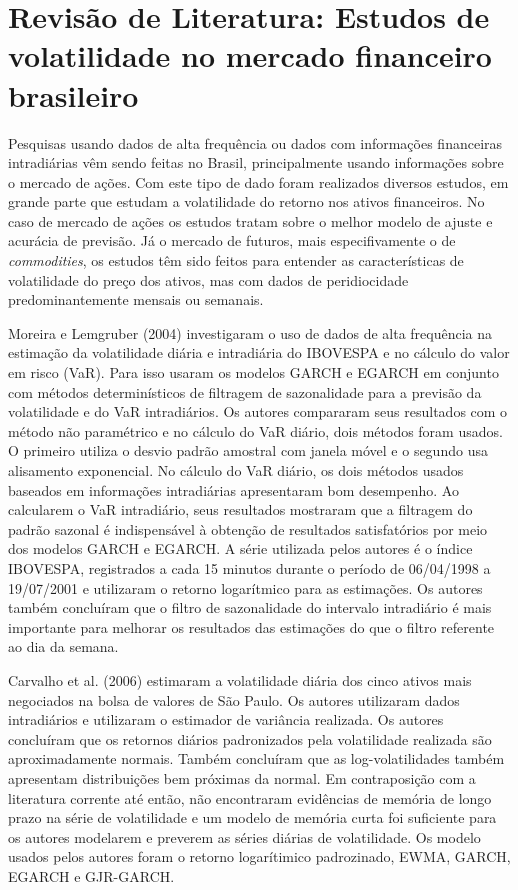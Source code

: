 \documentclass[]{article}
\title{}
\author{}
\date{}
\begin{document}
\section{Revisão de Literatura: Estudos de volatilidade no mercado
financeiro
brasileiro}\label{revisao-de-literatura-estudos-de-volatilidade-no-mercado-financeiro-brasileiro}

Pesquisas usando dados de alta frequência ou dados com informações
financeiras intradiárias vêm sendo feitas no Brasil, principalmente
usando informações sobre o mercado de ações. Com este tipo de dado foram
realizados diversos estudos, em grande parte que estudam a volatilidade
do retorno nos ativos financeiros. No caso de mercado de ações os
estudos tratam sobre o melhor modelo de ajuste e acurácia de previsão.
Já o mercado de futuros, mais especifivamente o de \emph{commodities},
os estudos têm sido feitos para entender as características de
volatilidade do preço dos ativos, mas com dados de peridiocidade
predominantemente mensais ou semanais.

Moreira e Lemgruber (2004) investigaram o uso de dados de alta
frequência na estimação da volatilidade diária e intradiária do IBOVESPA
e no cálculo do valor em risco (VaR). Para isso usaram os modelos GARCH
e EGARCH em conjunto com métodos determinísticos de filtragem de
sazonalidade para a previsão da volatilidade e do VaR intradiários. Os
autores compararam seus resultados com o método não paramétrico e no
cálculo do VaR diário, dois métodos foram usados. O primeiro utiliza o
desvio padrão amostral com janela móvel e o segundo usa alisamento
exponencial. No cálculo do VaR diário, os dois métodos usados baseados
em informações intradiárias apresentaram bom desempenho. Ao calcularem o
VaR intradiário, seus resultados mostraram que a filtragem do padrão
sazonal é indispensável à obtenção de resultados satisfatórios por meio
dos modelos GARCH e EGARCH. A série utilizada pelos autores é o índice
IBOVESPA, registrados a cada 15 minutos durante o período de 06/04/1998
a 19/07/2001 e utilizaram o retorno logarítmico para as estimações. Os
autores também concluíram que o filtro de sazonalidade do intervalo
intradiário é mais importante para melhorar os resultados das estimações
do que o filtro referente ao dia da semana.

Carvalho et al. (2006) estimaram a volatilidade diária dos cinco ativos
mais negociados na bolsa de valores de São Paulo. Os autores utilizaram
dados intradiários e utilizaram o estimador de variância realizada. Os
autores concluíram que os retornos diários padronizados pela
volatilidade realizada são aproximadamente normais. Também concluíram
que as log-volatilidades também apresentam distribuições bem próximas da
normal. Em contraposição com a literatura corrente até então, não
encontraram evidências de memória de longo prazo na série de
volatilidade e um modelo de memória curta foi suficiente para os autores
modelarem e preverem as séries diárias de volatilidade. Os modelo usados
pelos autores foram o retorno logarítimico padrozinado, EWMA, GARCH,
EGARCH e GJR-GARCH.
\end{document}
